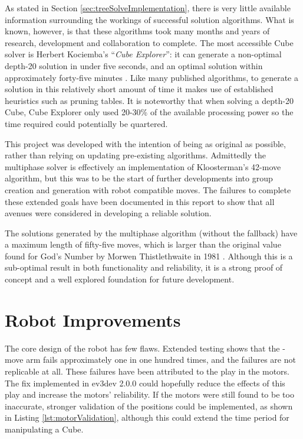 \documentclass{report}
\newcommand{\tit}[1]{\textit{#1}}
\newcommand{\propernoun}[1]{\enquote{\tit{#1}}}
\newcommand{\move}[1]{\uppercase{\texttt{\formatmovesnospace{#1}}}-move}
\newcommand{\depth}[1]{depth-#1}
\begin{document}
	As stated in Section \ref{sec:treeSolveImplementation}, there is very little available information surrounding the workings of successful solution algorithms. What is known, however, is that these algorithms took many months and years of research, development and collaboration to complete. The most accessible Cube solver is Herbert Kociemba's \propernoun{Cube Explorer}: it can generate a non-optimal \depth{20} solution in under five seconds, and an optimal solution within approximately forty-five minutes \cite{Kociemba}. Like many published algorithms, to generate a solution in this relatively short amount of time it makes use of established heuristics such as pruning tables. It is noteworthy that when solving a \depth{20} Cube, Cube Explorer only used 20-30\% of the available processing power so the time required could potentially be quartered.
	
	This project was developed with the intention of being as original as possible, rather than relying on updating pre-existing algorithms. Admittedly the multiphase solver is effectively an implementation of Kloosterman's 42-move algorithm, but this was to be the start of further developments into group creation and generation with robot compatible moves. The failures to complete these extended goals have been documented in this report to show that all avenues were considered in developing a reliable solution.
	
	The solutions generated by the multiphase algorithm (without the fallback) have a maximum length of fifty-five moves, which is larger than the original value found for God's Number by Morwen Thistlethwaite in 1981 \cite{Singmaster1981}. Although this is a sub-optimal result in both functionality and reliability, it is a strong proof of concept and a well explored foundation for future development.
	
	\section{Robot Improvements}
	
	The core design of the robot has few flaws. Extended testing shows that the \move{x} arm fails approximately one in one hundred times, and the failures are not replicable at all. These failures have been attributed to the play in the motors. The fix implemented in ev3dev 2.0.0 could hopefully reduce the effects of this play and increase the motors' reliability. If the motors were still found to be too inaccurate, stronger validation of the positions could be implemented, as shown in Listing \ref{lst:motorValidation}, although this could extend the time period for manipulating a Cube. 
	
\end{document}
